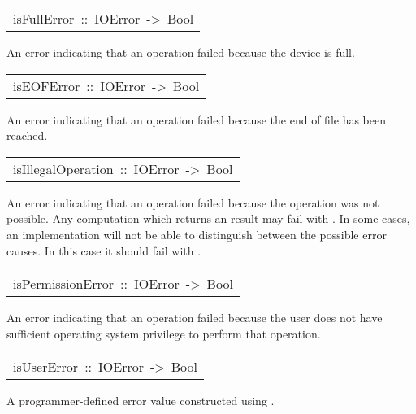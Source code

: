 \begin{haddockdesc}
\item[\begin{tabular}{@{}l}
isFullError\ ::\ IOError\ ->\ Bool
\end{tabular}]\haddockbegindoc
An error indicating that an  operation failed because
 the device is full.
\par

\end{haddockdesc}
\begin{haddockdesc}
\item[\begin{tabular}{@{}l}
isEOFError\ ::\ IOError\ ->\ Bool
\end{tabular}]\haddockbegindoc
An error indicating that an  operation failed because
 the end of file has been reached.
\par

\end{haddockdesc}
\begin{haddockdesc}
\item[\begin{tabular}{@{}l}
isIllegalOperation\ ::\ IOError\ ->\ Bool
\end{tabular}]\haddockbegindoc
An error indicating that an  operation failed because
 the operation was not possible.
 Any computation which returns an  result may fail with
 .  In some cases, an implementation will not be
 able to distinguish between the possible error causes.  In this case
 it should fail with .
\par

\end{haddockdesc}
\begin{haddockdesc}
\item[\begin{tabular}{@{}l}
isPermissionError\ ::\ IOError\ ->\ Bool
\end{tabular}]\haddockbegindoc
An error indicating that an  operation failed because
 the user does not have sufficient operating system privilege
 to perform that operation.
\par

\end{haddockdesc}
\begin{haddockdesc}
\item[\begin{tabular}{@{}l}
isUserError\ ::\ IOError\ ->\ Bool
\end{tabular}]\haddockbegindoc
A programmer-defined error value constructed using .
\par

\end{haddockdesc}
